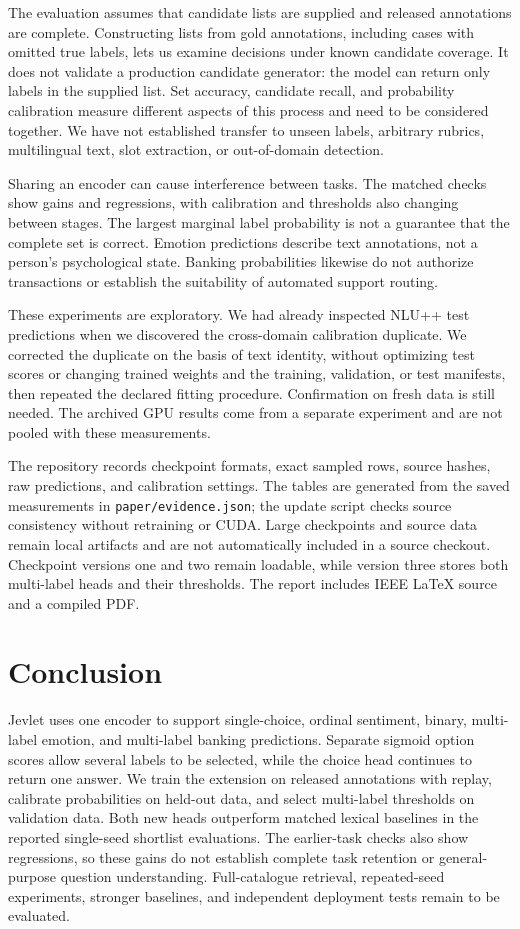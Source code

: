 \documentclass[conference]{IEEEtran}
\begin{document}
The evaluation assumes that candidate lists are supplied and released annotations are complete. Constructing lists from gold annotations, including cases with omitted true labels, lets us examine decisions under known candidate coverage. It does not validate a production candidate generator: the model can return only labels in the supplied list. Set accuracy, candidate recall, and probability calibration measure different aspects of this process and need to be considered together. We have not established transfer to unseen labels, arbitrary rubrics, multilingual text, slot extraction, or out-of-domain detection.

Sharing an encoder can cause interference between tasks. The matched checks show gains and regressions, with calibration and thresholds also changing between stages. The largest marginal label probability is not a guarantee that the complete set is correct. Emotion predictions describe text annotations, not a person's psychological state. Banking probabilities likewise do not authorize transactions or establish the suitability of automated support routing.

These experiments are exploratory. We had already inspected NLU++ test predictions when we discovered the cross-domain calibration duplicate. We corrected the duplicate on the basis of text identity, without optimizing test scores or changing trained weights and the training, validation, or test manifests, then repeated the declared fitting procedure. Confirmation on fresh data is still needed. The archived GPU results come from a separate experiment and are not pooled with these measurements.

The repository records checkpoint formats, exact sampled rows, source hashes, raw predictions, and calibration settings. The tables are generated from the saved measurements in \texttt{paper/evidence.json}; the update script checks source consistency without retraining or CUDA. Large checkpoints and source data remain local artifacts and are not automatically included in a source checkout. Checkpoint versions one and two remain loadable, while version three stores both multi-label heads and their thresholds. The report includes IEEE LaTeX source and a compiled PDF.

\section{Conclusion}
Jevlet uses one encoder to support single-choice, ordinal sentiment, binary, multi-label emotion, and multi-label banking predictions. Separate sigmoid option scores allow several labels to be selected, while the choice head continues to return one answer. We train the extension on released annotations with replay, calibrate probabilities on held-out data, and select multi-label thresholds on validation data. Both new heads outperform matched lexical baselines in the reported single-seed shortlist evaluations. The earlier-task checks also show regressions, so these gains do not establish complete task retention or general-purpose question understanding. Full-catalogue retrieval, repeated-seed experiments, stronger baselines, and independent deployment tests remain to be evaluated.
\end{document}
